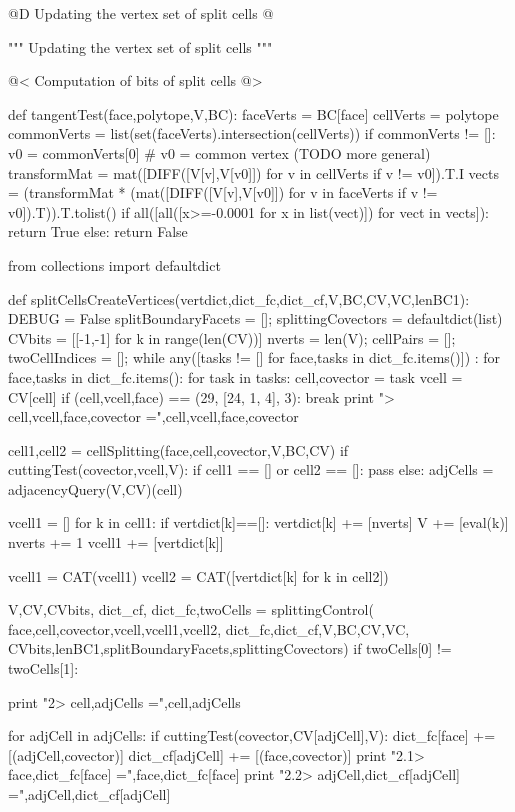 \documentclass[11pt,oneside]{article}	%
\begin{document}
@D Updating the vertex set  of split cells
@{""" Updating the vertex set of split cells """

@< Computation of bits of split cells @>

def tangentTest(face,polytope,V,BC):
	faceVerts = BC[face]
	cellVerts = polytope
	commonVerts = list(set(faceVerts).intersection(cellVerts))
	if commonVerts != []:
		v0 = commonVerts[0] # v0 = common vertex (TODO more general)
		transformMat = mat([DIFF([V[v],V[v0]]) for v in cellVerts if v != v0]).T.I
		vects = (transformMat * (mat([DIFF([V[v],V[v0]]) for v in faceVerts 
					if v != v0]).T)).T.tolist()
		if all([all([x>=-0.0001 for x in list(vect)]) for vect in vects]): 
			return True
	else: return False

from collections import defaultdict

def splitCellsCreateVertices(vertdict,dict_fc,dict_cf,V,BC,CV,VC,lenBC1):
	DEBUG = False
	splitBoundaryFacets = []; splittingCovectors = defaultdict(list)
	CVbits = [[-1,-1] for k in range(len(CV))] 
	nverts = len(V); cellPairs = []; twoCellIndices = []; 
	while any([tasks != [] for face,tasks in dict_fc.items()]) : 
		for face,tasks in dict_fc.items():
			for task in tasks:
				cell,covector = task
				vcell = CV[cell]
				if (cell,vcell,face) == (29, [24, 1, 4], 3): break
				print "> cell,vcell,face,covector =",cell,vcell,face,covector

				cell1,cell2 = cellSplitting(face,cell,covector,V,BC,CV)
				if cuttingTest(covector,vcell,V):
					if cell1 == [] or cell2 == []:
						pass
					else:
						adjCells = adjacencyQuery(V,CV)(cell)
												
						vcell1 = []
						for k in cell1:
							if vertdict[k]==[]: 
								vertdict[k] += [nverts]
								V += [eval(k)]
								nverts += 1
							vcell1 += [vertdict[k]]
						
						vcell1 = CAT(vcell1)
						vcell2 = CAT([vertdict[k] for k in cell2])							
															
						V,CV,CVbits, dict_cf, dict_fc,twoCells = splittingControl(
							face,cell,covector,vcell,vcell1,vcell2, dict_fc,dict_cf,V,BC,CV,VC,
							CVbits,lenBC1,splitBoundaryFacets,splittingCovectors)
						if twoCells[0] != twoCells[1]:

							print "2> cell,adjCells =",cell,adjCells
							
							for adjCell in adjCells:
								if cuttingTest(covector,CV[adjCell],V):
    								dict_fc[face] += [(adjCell,covector)]     								
    								dict_cf[adjCell] += [(face,covector)] 
    								print "2.1> face,dict_fc[face] =",face,dict_fc[face]
    								print "2.2> adjCell,dict_cf[adjCell] =",adjCell,dict_cf[adjCell]

}
\end{document}

